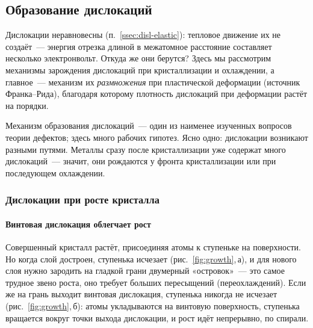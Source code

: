 \subsection{Образование дислокаций}\label{ssec:disl-origin}

\begin{orientir}
Дислокации неравновесны (п.~\ref{ssec:disl-elastic}): тепловое движение
их не создаёт~— энергия отрезка длиной в межатомное расстояние составляет
несколько электронвольт. Откуда же они берутся? Здесь мы рассмотрим
механизмы зарождения дислокаций при кристаллизации и охлаждении, а
главное~— механизм их \emph{размножения} при пластической деформации
(источник Франка--Рида), благодаря которому плотность дислокаций при
деформации растёт на порядки.
\end{orientir}

Механизм образования дислокаций~— один из наименее изученных вопросов
теории дефектов; здесь много рабочих гипотез. Ясно одно: дислокации
возникают разными путями. Металлы сразу после кристаллизации уже содержат
много дислокаций~— значит, они рождаются у фронта кристаллизации или при
последующем охлаждении.

\subsubsection{Дислокации при росте кристалла}

\paragraph{Винтовая дислокация облегчает рост}
Совершенный кристалл растёт, присоединяя атомы к ступеньке на
поверхности. Но когда слой достроен, ступенька исчезает
(рис.~\ref{fig:growth},\,а), и для нового слоя нужно зародить на гладкой
грани двумерный «островок»~— это самое трудное звено роста, оно требует
больших пересыщений (переохлаждений). Если же на грань выходит винтовая
дислокация, ступенька никогда не исчезает (рис.~\ref{fig:growth},\,б):
атомы укладываются на винтовую поверхность, ступенька вращается вокруг
точки выхода дислокации, и рост идёт непрерывно, по спирали.

